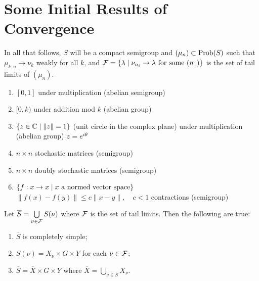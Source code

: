 

\section{Some Initial Results of Convergence}
\label{sec:3.4}

In all that follows, $S$ will be a compact semigroup and
$(\mu_n) \subset \hbox{Prob}(S)$ such that $\mu_{k,n} \to \nu_k$ weakly for all
$k$, and $\mathcal{F} = \{ \lambda \mid \nu_{n_i} \to \lambda \hbox{ for some }
(n_1)\}$ is the set of tail limits of $(\mu_n)$.

%
\begin{enumerate}
\item[(1)] $[0,1]$ under multiplication \quad (abelian semigroup)

\item[(2)] $[0,k)$ under addition mod $k$ \quad (abelian group)

\item[(3)] $\{ z \in \mathbb{C} \mid \|z\| = 1 \}$ \quad (unit circle in
     the complex plane) \newline
     under multiplication \quad (abelian group)
     \newline
     $z = e^{i\theta}$

\item[(4)] $n \times n$ stochastic matrices \quad (semigroup)

\item[(5)] $n \times n$ doubly stochastic matrices \quad (semigroup)

\item[(6)] $\{ f: x \to x \mid x \hbox{ a normed vector space} \}$
     \newline
     $\|f(x) - f(y)\| \le c \|x-y\|, \quad c < 1$
     \newline
     contractions \quad (semigroup)
\end{enumerate}
%

\begin{theorem}  	\label{thm:3.3}
Let $\overline S = \bigcup\limits_{\nu\in\mathcal{F}}
S(\nu)$ where $\mathcal{F}$ is the set of tail limits.  Then the following are
true:
\begin{enumerate}
\item[(a)] $\overline S $ is completely simple;

\item[(b)] $S(\nu) = X_\nu \times G \times Y$ for each $\nu \in \mathcal{F}$;

\item[(c)] $\overline S = \overline X \times G \times Y$ where $\overline X = \bigcup\limits_{\nu \in \overline S} X_\nu$.
\end{enumerate}
\end{theorem}


